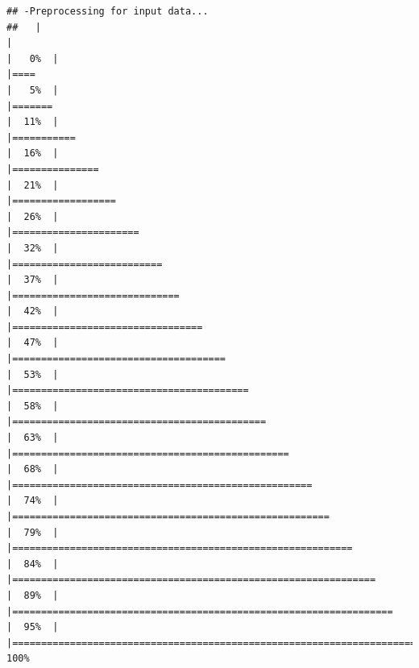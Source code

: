 \begin{verbatim}
## -Preprocessing for input data...
##   |                                                                              |                                                                      |   0%  |                                                                              |====                                                                  |   5%  |                                                                              |=======                                                               |  11%  |                                                                              |===========                                                           |  16%  |                                                                              |===============                                                       |  21%  |                                                                              |==================                                                    |  26%  |                                                                              |======================                                                |  32%  |                                                                              |==========================                                            |  37%  |                                                                              |=============================                                         |  42%  |                                                                              |=================================                                     |  47%  |                                                                              |=====================================                                 |  53%  |                                                                              |=========================================                             |  58%  |                                                                              |============================================                          |  63%  |                                                                              |================================================                      |  68%  |                                                                              |====================================================                  |  74%  |                                                                              |=======================================================               |  79%  |                                                                              |===========================================================           |  84%  |                                                                              |===============================================================       |  89%  |                                                                              |==================================================================    |  95%  |                                                                              |======================================================================| 100%
\end{verbatim}

